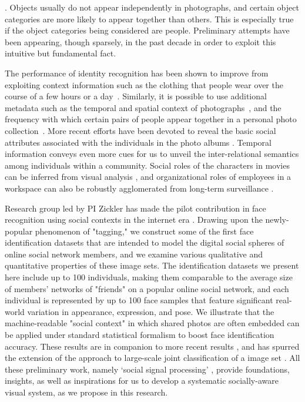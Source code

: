. Objects usually do not appear independently in photographs, and certain object categories are more likely to appear together than others. This is especially true if the object categories being considered are people. Preliminary attempts have been appearing, though sparsely, in the past decade in order to exploit this intuitive but fundamental fact. 

The performance of identity recognition has been shown to improve from exploiting context information such as the clothing that people wear over the course of a few hours or a day~\cite{anguelov2007cir, zhang2003aah,  song2006cah, sivic2006fpr}. Similarly, it is possible to use additional metadata such as the temporal and spatial context of photographs~\cite{naaman2005lcr, zhao2006apa}, and the frequency with which certain pairs of people appear together in a personal photo collection~\cite{anguelov2007cir}. More recent efforts have been devoted to reveal the basic social attributes associated with the individuals in the photo albums \cite{Gallagher,Wang2010}. Temporal information conveys even more cues for us to unveil the inter-relational semantics among individuals within a community. Social roles of the characters in movies can be inferred from visual analysis \cite{Ding2010,Ding2011}, and organizational roles of employees in a workspace can also be robustly agglomerated from long-term surveillance \cite{Yu2009,Zhang2011}.

Research group led by PI Zickler has made the pilot contribution in face recognition using social contexts in the internet era \cite{Stone2008,Stone2010}. Drawing upon the newly-popular phenomenon of "tagging," we construct some of the first face identification datasets that are intended to model the digital social spheres of online social network members, and we examine various qualitative and quantitative properties of these image sets. The identification datasets we present here include up to 100 individuals, making them comparable to the average size of members' networks of "friends" on a popular online social network, and each individual is represented by up to 100 face samples that feature significant real-world variation in appearance, expression, and pose. We illustrate that the machine-readable "social context" in which shared photos are often embedded can be applied under standard statistical formalism to boost face identification accuracy. These results are in companion to more recent results \cite{Dikmen:classify,LeeBMVC2011,Murillo2012,Poppe2012}, and has spurred the extension of the approach to large-scale joint classification of a image set \cite{McAuley:socialclassify}. All these preliminary work, namely `social signal processing' \cite{Pantic}, provide foundations, insights, as well as inspirations for us to develop a systematic socially-aware visual system, as we propose in this research.

